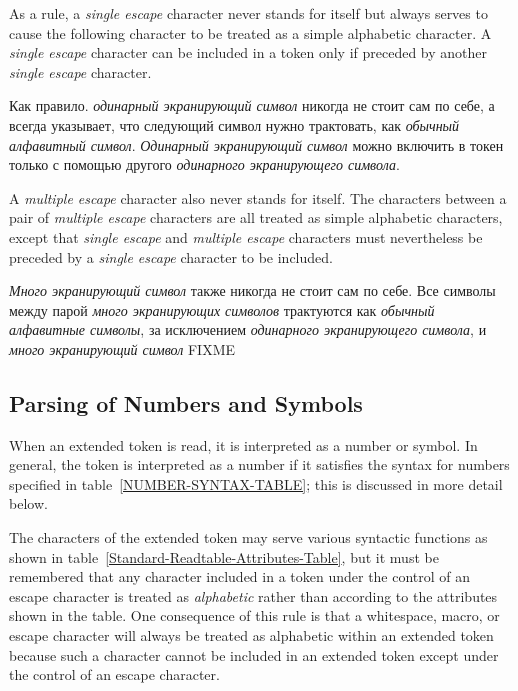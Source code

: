 \endgroup

As a rule, a \emph{single escape} character never stands for itself but always
serves to cause the following character to be treated as a simple alphabetic
character.  A \emph{single escape} character can be included in a token only
if preceded by another \emph{single escape} character.

Как правило. \emph{одинарный экранирующий символ} никогда не стоит сам
по себе, а всегда указывает, что следующий символ нужно трактовать,
как \emph{обычный алфавитный символ}. \emph{Одинарный экранирующий
  символ} можно включить в токен только с помощью другого
\emph{одинарного экранирующего символа}.

A \emph{multiple escape} character also never stands for itself.  The characters
between a pair of \emph{multiple escape} characters are all treated as
simple alphabetic characters, except that \emph{single escape} and
\emph{multiple escape} characters must nevertheless be preceded by
a \emph{single escape} character to be included.

\emph{Много экранирующий символ} также никогда не стоит сам по
себе. Все символы между парой \emph{много экранирующих символов}
трактуются как \emph{обычный алфавитные символы}, за исключением
\emph{одинарного экранирующего символа}, и \emph{много экранирующий
  символ} FIXME

\subsection{Parsing of Numbers and Symbols}
\label{PARSE-TOKENS-SECTION}


When an extended token is read, it is interpreted as a number or symbol.
In general, the token is interpreted as a number if it satisfies
the syntax for numbers specified in table~\ref{NUMBER-SYNTAX-TABLE};
this is discussed in more detail below.

The characters of the extended token may serve various syntactic
functions as shown
in table~\ref{Standard-Readtable-Attributes-Table}, but it must be
remembered that any character included in a token under the control
of an escape character is treated as \emph{alphabetic} rather than
according to the attributes shown in the table.
One consequence of this rule is that a whitespace, macro, or escape
character will always be treated as alphabetic within an extended token
because such a character cannot be included in an extended
token except under the control of an escape character.

